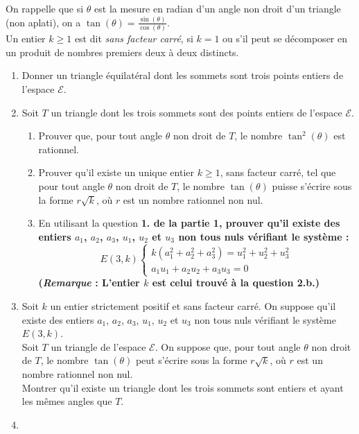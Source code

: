 \documentclass[landscape,twocolumn,leqno,a4paper,10pt]{report} %
\newcommand\n{\noindent}
\renewcommand{\geq}{\geqslant}
\renewcommand{\textbf}[1]{\begingroup\bfseries\mathversion{bold}#1\endgroup}		%
\begin{document}
\n On rappelle que si $\theta$ est la mesure en radian d'un angle non droit d'un triangle (non aplati), on a $\tan (\theta)=\frac{\sin (\theta)}{\cos (\theta)}$.\\

\n Un entier $k \geq 1$ est dit \textit{sans facteur carré}, si $k=1$ ou s'il peut se décomposer en un produit de nombres premiers deux à deux distincts.

\begin{enumerate}
	\item Donner un triangle équilatéral dont les sommets sont trois points entiers de l'espace $\mathscr{E}$.
	\item Soit $T$ un triangle dont les trois sommets sont des points entiers de l'espace $\mathscr{E}$.
	\begin{enumerate}
		\item Prouver que, pour tout angle $\theta$ non droit de $T$, le nombre $\tan ^{2}(\theta)$ est rationnel.
		\item Prouver qu'il existe un unique entier $k \geq 1$, sans facteur carré, tel que pour tout angle $\theta$ non droit de $T$, le nombre $\tan (\theta)$ puisse s'écrire sous la forme $r \sqrt{k}$, où $r$ est un nombre rationnel non nul.
		\item En utilisant la question \textbf{1.} de la partie 1, prouver qu'il existe des entiers $a_{1}$, $a_{2}$, $a_{3}$, $u_{1}$, $u_{2}$ et $u_{3}$ non tous nuls vérifiant le système :
		$$E(3, k)\left\{\begin{array}{c}
k\left(a_{1}^{2}+a_{2}^{2}+a_{3}^{2}\right)=u_{1}^{2}+u_{2}^{2}+u_{3}^{2} \\
a_{1} u_{1}+a_{2} u_{2}+a_{3} u_{3}=0
\end{array}\right.$$
	(\textit{Remarque} : L'entier $k$ est celui trouvé à la question \textbf{2.b.})
	\end{enumerate}
	\item Soit $k$ un entier strictement positif et sans facteur carré. On suppose qu'il existe des entiers $a_{1}$, $a_{2}$, $a_{3}$, $u_{1}$, $u_{2}$ et $u_{3}$ non tous nuls vérifiant le système $E(3, k)$.\\
	Soit $T$ un triangle de l'espace $\mathscr{E}$. On suppose que, pour tout angle $\theta$ non droit de $T$, le nombre $\tan (\theta)$ peut s'écrire sous la forme $r \sqrt{k}$, où $r$ est un nombre rationnel non nul.\\
	Montrer qu'il existe un triangle dont les trois sommets sont entiers et ayant les mêmes angles que $T$.
	\item \begin{enumerate}

\end{enumerate}
\end{enumerate}
\end{document}
